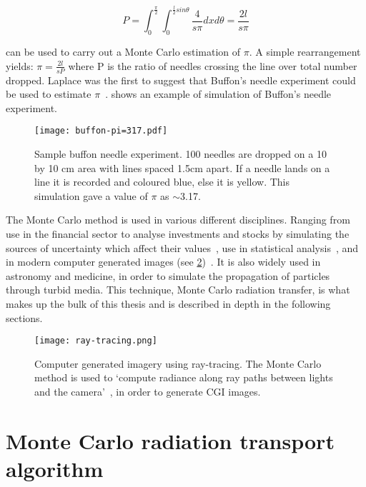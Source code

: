 \begin{equation}
P=\int_0^{\frac{\pi}{2}}\int_0^{\frac{l}{2}sin\theta}\frac{4}{s\pi}dx d\theta = \frac{2 l}{s \pi}\label{eqn:buffon}
\end{equation}


 can be used to carry out a Monte Carlo estimation of $\pi$. A simple rearrangement yields: $\pi = \tfrac{2l}{sP}$ where P is the ratio of needles crossing the line over total number dropped. Laplace was the first to suggest that Buffon's needle experiment could be used to estimate $\pi$~\cite{beckmann2015history}.  shows an example of simulation of Buffon's needle experiment.

\begin{figure}[!htb]
\centering
\texttt{[image: buffon-pi=317.pdf]}
\caption{Sample buffon needle experiment. 100 needles are dropped on a 10 by 10 cm area with lines spaced 1.5cm apart. If a needle lands on a line it is recorded and coloured blue, else it is yellow. This simulation gave a value of $\pi$ as $\sim$3.17.}
\label{fig:buffon-needle}
\end{figure}

The Monte Carlo method is used in various different disciplines. Ranging from use in the financial sector to analyse investments and stocks by simulating the sources of uncertainty which affect their values~\cite{jackel2002monte,finaceprrof}, use in statistical analysis~\cite{wall2012practical}, and in modern computer generated images (see \cref{fig:ray-trace})~\cite{Kajiyarendering,Cookraytracing}. It is also widely used in astronomy and medicine, in order to simulate the propagation of particles through turbid media. This technique, Monte Carlo radiation transfer, is what makes up the bulk of this thesis and is described in depth in the following sections.

\begin{figure}[!htb]
\centering
\texttt{[image: ray-tracing.png]}
\caption{Computer generated imagery using ray-tracing. The Monte Carlo method is used to `compute radiance along ray paths between lights and the camera'~\cite{pharr2016physically}, in order to generate CGI images.}
\label{fig:ray-trace}
\end{figure}
\newpage
\section{Monte Carlo radiation transport algorithm}


